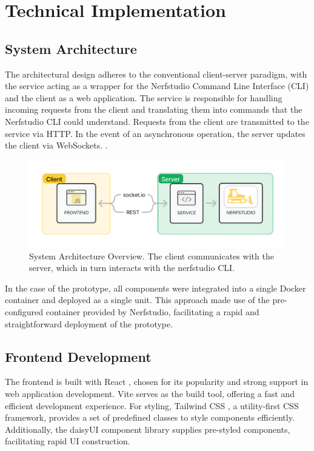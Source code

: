 %
\chapter{Technical Implementation}
\label{sec:system}

\section{System Architecture}
\label{sec:system:architecture}

The architectural design adheres to the conventional client-server paradigm, with the service acting as a wrapper for the Nerfstudio Command Line Interface (CLI) and the client as a web application.
The service is responsible for handling incoming requests from the client and translating them into commands that the Nerfstudio CLI could understand.
Requests from the client are transmitted to the service via HTTP.
In the event of an asynchronous operation, the server updates the client via WebSockets. .

\begin{figure}[htb]
	\includegraphics[width=\textwidth]{figures/architecture-1.png}
	\caption{System Architecture Overview. The client communicates with the server, which in turn interacts with the nerfstudio CLI.}
	\label{fig:system:example2}
\end{figure}

In the case of the prototype, all components were integrated into a single Docker \cite{noauthor_docker_2022} container and deployed as a single unit.
This approach made use of the pre-configured container provided by Nerfstudio, facilitating a rapid and straightforward deployment of the prototype.

\section{Frontend Development} 
\label{sec:system:frontend}

The frontend is built with React \cite{noauthor_react_nodate}, chosen for its popularity and strong support in web application development.
Vite \cite{noauthor_vite_nodate} serves as the build tool, offering a fast and efficient development experience.
For styling, Tailwind CSS \cite{noauthor_tailwind_2020}, a utility-first CSS framework, provides a set of predefined classes to style components efficiently.
Additionally, the daisyUI \cite{noauthor_daisyui_nodate} component library supplies pre-styled components, facilitating rapid UI construction.

